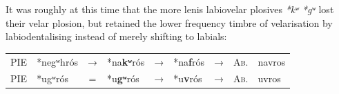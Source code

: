 \documentclass[svgnames,x11names,b5paper]{book}
\begin{document}
        It was roughly at this time that the more lenis labiovelar plosives \textit{*kʷ *gʷ} lost their velar plosion, but retained the lower frequency timbre of velarisation by labiodentalising instead of merely shifting to labials:

            \begin{table}[H]
                \begin{center}
                \begin{tabular}{llcllllll}
                \textsc{PIE} & *negʷhrós & → & *na\textbf{kʷ}rós & → & *na\textbf{f}rós & → & \textsc{Ab.} & navros\\
                \textsc{PIE} & *ugʷrós & = & *u\textbf{gʷ}rós & → & *u\textbf{v}rós & → & \textsc{Ab.} & uvros\\
                \end{tabular}
                \end{center}
                \end{table}
        
\end{document}
